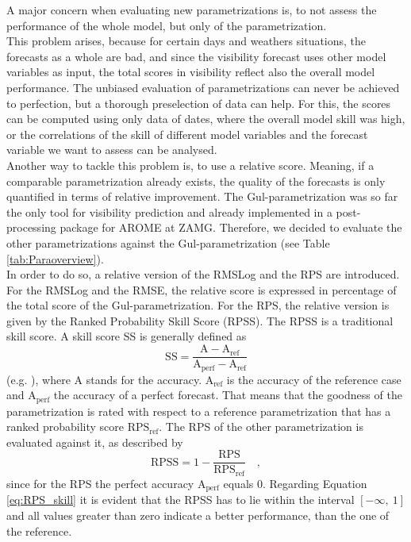 A major concern when evaluating new parametrizations is, to not assess the performance of the whole model, but only of the parametrization. \\
This problem arises, because for certain days and weathers situations, the forecasts as a whole are bad, and since the visibility forecast uses other model variables as input, the total scores in visibility reflect also the overall model performance. 
The unbiased evaluation of parametrizations can never be achieved to perfection, but a thorough preselection of data can help. For this, the scores can be computed using only data of dates, where the overall model skill was high, or  the correlations of the skill of different model variables and the forecast variable we want to assess can be analysed.\\
Another way to tackle this problem is, to use a relative score. Meaning, if a comparable parametrization already exists, the quality of the forecasts is only quantified in terms of relative improvement.
The Gul-parametrization was so far the only tool for visibility prediction and already implemented in a post-processing package for AROME at ZAMG. Therefore, we decided to evaluate the other parametrizations against the Gul-parametrization (see Table \ref{tab:Paraoverview}).\\
In order to do so, a relative version of the RMSLog and the RPS are introduced. 
For the RMSLog and the RMSE, the relative score is expressed in percentage of the total score of the Gul-parametrization.
For the RPS, the relative version is given by the Ranked Probability Skill Score (RPSS). The RPSS is a traditional skill score. A skill score SS is generally defined as 
\begin{equation}
    \mathrm{SS}=\frac{\mathrm{A}- \mathrm{A_{ref}}}{\mathrm{A_{perf}} - \mathrm{A_{ref}}}
\end{equation}
(e.g. \citeauthor{wilks2011statistical} \cite{wilks2011statistical} ), where A stands for the accuracy. $\mathrm{A_{ref}}$ is the accuracy of the reference case  and $\mathrm{A_{perf}}$ the accuracy of a perfect forecast.
That means that the goodness of the parametrization is rated with respect to a reference parametrization that has a ranked probability score $\mathrm{RPS_{ref}}$. The RPS of the other parametrization is evaluated against it, as described by 
\begin{equation}
    \mathrm{RPSS} = 1 - \frac{\mathrm{RPS}}{\mathrm{RPS}_\mathrm{ref}} \quad ,
    \label{eq:RPS_skill}
\end{equation}
since for the RPS  the perfect accuracy $\mathrm{A_{perf}}$ equals 0. Regarding Equation \eqref{eq:RPS_skill} it is evident that the RPSS has to lie within the interval $[- \infty, \ 1]$ and all values greater than zero indicate a better performance, than the one of the reference. 
